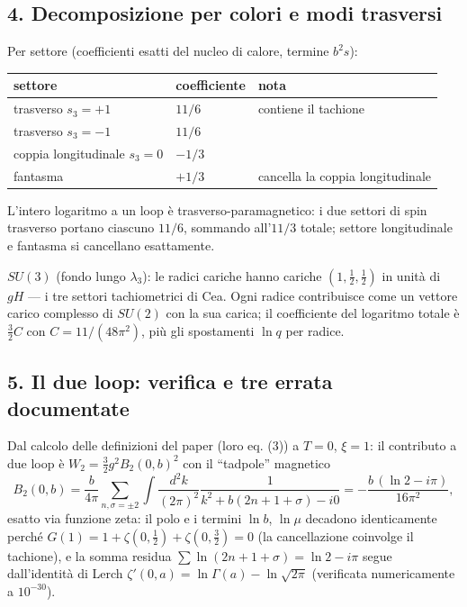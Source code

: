 \documentclass[
]{article}
\begin{document}
\hypertarget{decomposizione-per-colori-e-modi-trasversi}{%
\subsection{4. Decomposizione per colori e modi
trasversi}\label{decomposizione-per-colori-e-modi-trasversi}}

Per settore (coefficienti esatti del nucleo di calore, termine
\(b^2 s\)):

\begin{longtable}[]{@{}lll@{}}
\toprule\noalign{}
settore & coefficiente & nota \\
\midrule\noalign{}
\endhead
\bottomrule\noalign{}
\endlastfoot
trasverso \(s_3 = +1\) & \(11/6\) & contiene il tachione \\
trasverso \(s_3 = -1\) & \(11/6\) & \\
coppia longitudinale \(s_3 = 0\) & \(-1/3\) & \\
fantasma & \(+1/3\) & cancella la coppia longitudinale \\
\end{longtable}

L'intero logaritmo a un loop è trasverso-paramagnetico: i due settori di
spin trasverso portano ciascuno \(11/6\), sommando all'\(11/3\) totale;
settore longitudinale e fantasma si cancellano esattamente.

\textbf{\(SU(3)\)} (fondo lungo \(\lambda_3\)): le radici cariche hanno
cariche \((1, \tfrac12, \tfrac12)\) in unità di \(gH\) --- i tre settori
tachiometrici di Cea. Ogni radice contribuisce come un vettore carico
complesso di \(SU(2)\) con la sua carica; il coefficiente del logaritmo
totale è \(\tfrac32 C\) con \(C = 11/(48\pi^2)\), più gli spostamenti
\(\ln q\) per radice.

\hypertarget{il-due-loop-verifica-e-tre-errata-documentate}{%
\subsection{5. Il due loop: verifica e tre errata
documentate}\label{il-due-loop-verifica-e-tre-errata-documentate}}

Dal calcolo delle definizioni del paper (loro eq. (3)) a \(T=0\),
\(\xi = 1\): il contributo a due loop è
\(W_2 = \tfrac32 g^2 B_2(0,b)^2\) con il ``tadpole'' magnetico
\[B_2(0,b) = \frac{b}{4\pi}\sum_{n,\sigma=\pm2}\int\frac{d^2k}{(2\pi)^2}\frac{1}{k^2 + b(2n+1+\sigma) - i0} = -\frac{b\,(\ln 2 - i\pi)}{16\pi^2},\]
esatto via funzione zeta: il polo e i termini \(\ln b\), \(\ln\mu\)
decadono identicamente perché
\(G(1) = 1 + \zeta(0,\tfrac12) + \zeta(0,\tfrac32) = 0\) (la
cancellazione coinvolge il tachione), e la somma residua
\(\sum \ln(2n+1+\sigma) = \ln 2 - i\pi\) segue dall'identità di Lerch
\(\zeta'(0,a) = \ln\Gamma(a) - \ln\sqrt{2\pi}\) (verificata
numericamente a \(10^{-30}\)).
\end{document}
